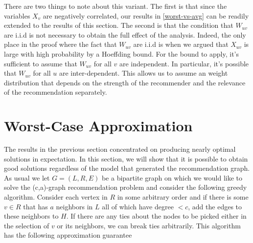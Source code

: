 \documentclass[]{article}
\begin{document}
There are two things to note about this variant. The first is that
since the variables $X_v$ are negatively correlated, our results in
\ref{worst-vs-avg} can be readily extended to the results of this
section. The second is that the condition that $W_{uv}$ are i.i.d
is not necessary to obtain the full effect of the analysis. Indeed,
the only place in the proof where the fact that $W_{uv}$ are i.i.d
is when we argued that $X_{uv}$ is large with high probability by a
Hoeffding bound. For the bound to apply, it's sufficient to assume
that $W_{uv}$ for all $v$ are independent. In particular, it's 
possible that $W_{uv}$ for all $u$ are inter-dependent. This allows
us to assume an weight distribution that depends on the strength of 
the recommender and the relevance of the recommendation separately.


\section{Worst-Case Approximation}
The results in the previous section concentrated on producing nearly
optimal solutions in expectation. In this section, we will show that
it is possible to obtain good solutions regardless of the model that
generated the recommendation graph. As usual we let $G=(L,R,E)$ be a
bipartite graph on which we would like to solve the (c,a)-graph
recommendation problem and consider the following greedy
algorithm. Consider each vertex in $R$ in some arbitrary order and if
there is some $v \in R$ that has $a$ neighbors in $L$ all of which
have degree $< c$, add the edges to these neighbors to $H$. If there
are any ties about the nodes to be picked either in the selection of
$v$ or its neighbors, we can break ties arbitrarily. This algorithm
has the following approximation guarantee
\end{document}
